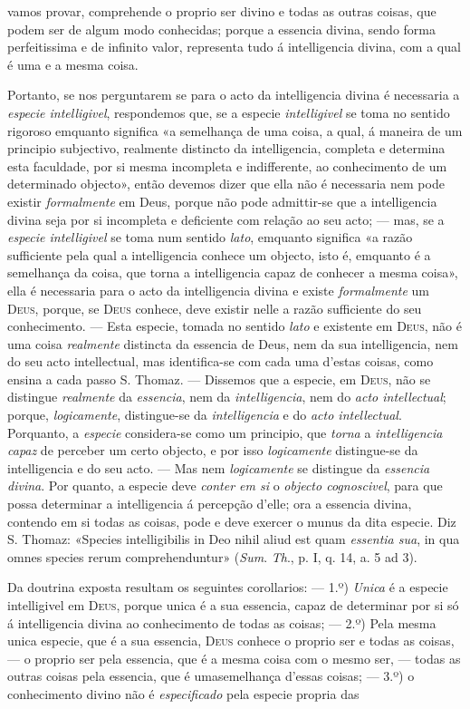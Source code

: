 vamos provar, comprehende o proprio ser divino e todas as outras coisas, que podem ser de algum modo conhecidas; porque a essencia divina, sendo forma perfeitissima e de infinito valor, representa tudo á intelligencia divina, com a qual é uma e a mesma coisa.\par Portanto, se nos perguntarem se para o acto da intelligencia divina é necessaria a \emph{especie intelligivel}, respondemos que, se a especie \emph{intelligivel} se toma no sentido rigoroso emquanto significa «a semelhança de uma coisa, a qual, á maneira de um principio subjectivo, realmente distincto da intelligencia, completa e determina esta faculdade, por si mesma incompleta e indifferente, ao conhecimento de um determinado objecto», então devemos dizer que ella não é necessaria nem pode existir \emph{formalmente} em Deus, porque não pode admittir-se que a intelligencia divina seja por si incompleta e deficiente com relação ao seu acto; --- mas, se a \emph{especie intelligivel} se toma num sentido \emph{lato}, emquanto significa «a razão sufficiente pela qual a intelligencia conhece um objecto, isto é, emquanto é a semelhança da coisa, que torna a intelligencia capaz de conhecer a mesma coisa», ella é necessaria para o acto da intelligencia divina e existe \emph{formalmente} um \textsc{Deus}, porque, se \textsc{Deus} conhece, deve existir nelle a razão sufficiente do seu conhecimento. --- Esta especie, tomada no sentido \emph{lato} e existente em \textsc{Deus}, não é uma coisa \emph{realmente} distincta da essencia de Deus, nem da sua intelligencia, nem do seu acto intellectual, mas identifica-se com cada uma d'estas coisas, como ensina a cada passo S. Thomaz. --- Dissemos que a especie, em \textsc{Deus}, não se distingue \emph{realmente} da \emph{essencia}, nem da \emph{intelligencia}, nem do \emph{acto intellectual}; porque, \emph{logicamente}, distingue-se da \emph{intelligencia} e do \emph{acto intellectual}. Porquanto, a \emph{especie} considera-se como um principio, que \emph{torna} a \emph{intelligencia capaz} de perceber um certo objecto, e por isso \emph{logicamente} distingue-se da intelligencia e do seu acto. --- Mas nem \emph{logicamente} se distingue da \emph{essencia divina}. Por quanto, a especie deve \emph{conter em si} o \emph{objecto cognoscivel}, para que possa determinar a intelligencia á percepção d'elle; ora a essencia divina, contendo em si todas as coisas, pode e deve exercer o munus da dita especie. Diz S. Thomaz: «Species intelligibilis in Deo nihil aliud est quam \emph{essentia sua}, in qua omnes species rerum comprehenduntur» (\emph{Sum}. \emph{Th}., p. I, q. 14, a. 5 ad 3).\par Da doutrina exposta resultam os seguintes corollarios: --- 1.º) \emph{Unica} é a especie intelligivel em \textsc{Deus}, porque unica é a sua essencia, capaz de determinar por si só á intelligencia divina ao conhecimento de todas as coisas; --- 2.º) Pela mesma unica especie, que é a sua essencia, \textsc{Deus} conhece o proprio ser e todas as coisas, --- o proprio ser pela essencia, que é a mesma coisa com o mesmo ser, --- todas as outras coisas pela essencia, que é umasemelhança d'essas coisas; --- 3.º) o conhecimento divino não é \emph{especificado} pela especie propria das 